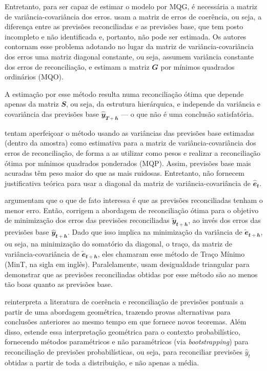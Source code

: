 \documentclass[
  12pt,
  oneside,
  a4paper,
  chapter=TITLE,
  section=TITLE,
  brazil]{abntex2}
\begin{document}
Entretanto, para ser capaz de estimar o modelo por MQG, é necessária a
matriz de variância-covariância dos erros. \textcite{hyndman2011} usam a
matriz de erros de coerência, ou seja, a diferença entre as previsões
reconciliadas e as previsões base, que tem posto incompleto e não
identificada e, portanto, não pode ser estimada. Os autores contornam
esse problema adotando no lugar da matriz de variância-covariância dos
erros uma matriz diagonal constante, ou seja, assumem variância
constante dos erros de reconciliação, e estimam a matriz
\(\mathbfit{G}\) por mínimos quadrados ordinários (MQO).

A estimação por esse método resulta numa reconciliação ótima que depende
apenas da matriz \(\mathbfit{S}\), ou seja, da estrutura hierárquica, e
independe da variância e covariância das previsões base
\(\mathbfit{\hat{y}_{T+h}}\) --- o que não é uma conclusão satisfatória.

\textcite{hyndman2016} tentam aperfeiçoar o método usando as variâncias
das previsões base estimadas (dentro da amostra) como estimativa para a
matriz de variância-covariância dos erros de reconciliação, de forma a
as utilizar como pesos e realizar a reconciliação ótima por mínimos
quadrados ponderados (MQP). Assim, previsões base mais acuradas têm peso
maior do que as mais ruidosas. Entretanto, não fornecem justificativa
teórica para usar a diagonal da matriz de variância-covariância de
\(\mathbfit{\hat{e}_{t}}\).

\textcite{wickramasuriya2019} argumentam que o que de fato interessa é
que as previsões reconciliadas tenham o menor erro. Então, corrigem a
abordagem de reconciliação ótima para o objetivo de minimização dos
erros das previsões reconciliadas \(\mathbfit{\tilde{y}_{t+h}}\), ao
invés dos erros das previsões base \(\mathbfit{\hat{y}_{t+h}}\). Dado
que isso implica na minimização da variância de
\(\mathbfit{\tilde{e}_{t+h}}\), ou seja, na minimização do somatório da
diagonal, o traço, da matriz de variância-covariância de
\(\mathbfit{\tilde{e}_{t+h}}\), eles chamaram esse método de Traço
Mínimo (MinT, na sigla em inglês). Paralelamente, usam desigualdade
triangular para demonstrar que as previsões reconciliadas obtidas por
esse método são ao menos tão boas quanto as previsões base.

\textcite{panagiotelis2021} reinterpreta a literatura de coerência e
reconciliação de previsões pontuais a partir de uma abordagem
geométrica, trazendo provas alternativas para conclusões anteriores ao
mesmo tempo em que fornece novos teoremas. Além disso,
\textcite{panagiotelis2021} estende essa interpretação geométrica para o
contexto probabilístico, fornecendo métodos paramétricos e não
paramétricos (via \emph{bootstrapping}) para reconciliação de previsões
probabilísticas, ou seja, para reconciliar previsões \(\hat{y}_t\)
obtidas a partir de toda a distribuição, e não apenas a média.
\end{document}
